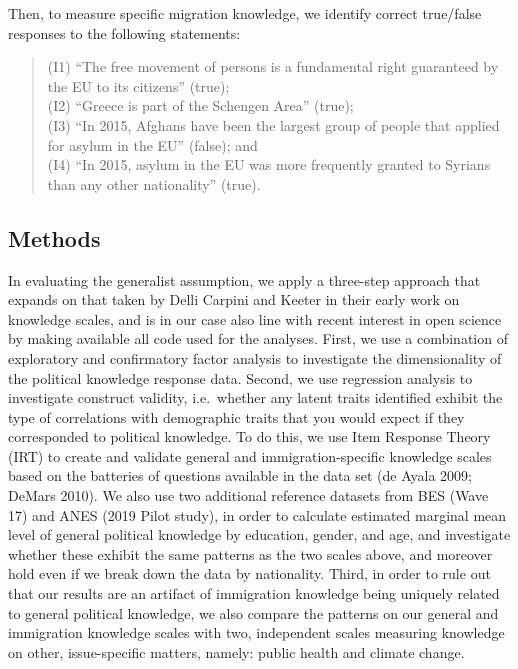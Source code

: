 \documentclass[11pt,halfline,a4paper,]{ouparticle}
\begin{document}
Then, to measure specific migration knowledge, we identify correct
true/false responses to the following statements:

\begin{quote}
(I1) ``The free movement of persons is a fundamental right guaranteed by
the EU to its citizens'' (true);\\
(I2) ``Greece is part of the Schengen Area'' (true);\\
(I3) ``In 2015, Afghans have been the largest group of people that
applied for asylum in the EU'' (false); and\\
(I4) ``In 2015, asylum in the EU was more frequently granted to Syrians
than any other nationality'' (true).
\end{quote}

\hypertarget{methods}{%
\subsection{Methods}\label{methods}}

In evaluating the generalist assumption, we apply a three-step approach
that expands on that taken by Delli Carpini and Keeter in their early
work on knowledge scales, and is in our case also line with recent
interest in open science by making available all code used for the
analyses. First, we use a combination of exploratory and confirmatory
factor analysis to investigate the dimensionality of the political
knowledge response data. Second, we use regression analysis to
investigate construct validity, i.e.~whether any latent traits
identified exhibit the type of correlations with demographic traits that
you would expect if they corresponded to political knowledge. To do
this, we use Item Response Theory (IRT) to create and validate general
and immigration-specific knowledge scales based on the batteries of
questions available in the data set (de Ayala 2009; DeMars 2010). We
also use two additional reference datasets from BES (Wave 17) and ANES
(2019 Pilot study), in order to calculate estimated marginal mean level
of general political knowledge by education, gender, and age, and
investigate whether these exhibit the same patterns as the two scales
above, and moreover hold even if we break down the data by nationality.
Third, in order to rule out that our results are an artifact of
immigration knowledge being uniquely related to general political
knowledge, we also compare the patterns on our general and immigration
knowledge scales with two, independent scales measuring knowledge on
other, issue-specific matters, namely: public health and climate change.
\end{document}
